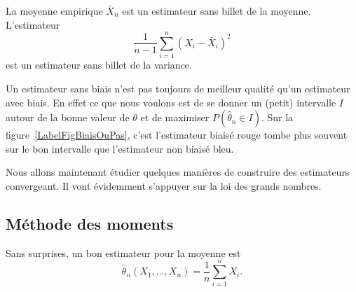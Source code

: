 \begin{example}
    La moyenne empirique \( \bar X_n\) est un estimateur sans billet de la moyenne. L'estimateur
    \begin{equation}
        \frac{1}{ n-1 }\sum_{i=1}^n(X_i-\bar X_i)^2
    \end{equation}
    est un estimateur sans billet de la variance.
\end{example}

Un estimateur sans biais n'est pas toujours de meilleur qualité qu'un estimateur avec biais. En effet ce que nous voulons est de se donner un (petit) intervalle  \( I\) autour de la bonne valeur de \( \theta\) et de maximiser \( P(\hat\theta_n\in I)\). Sur la figure~\ref{LabelFigBiaisOuPas}, c'est l'estimateur biaisé rouge tombe plus souvent sur le bon intervalle que l'estimateur non biaisé bleu.
\newcommand{\CaptionFigBiaisOuPas}{Un estimateur sans biais et un avec biais.}


Nous allons maintenant étudier quelques manières de construire des estimateurs convergeant. Il vont évidemment s'appuyer sur la loi des grands nombres.

\subsection{Méthode des moments}

Sans surprises, un bon estimateur pour la moyenne est
\begin{equation}
    \hat\theta_n(X_1,\ldots,X_n)=\frac{1}{ n }\sum_{i=1}^nX_i.
\end{equation}

